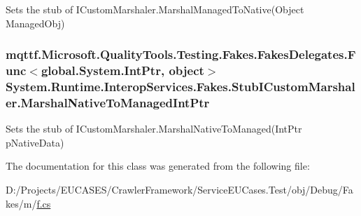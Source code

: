 Sets the stub of I\-Custom\-Marshaler.\-Marshal\-Managed\-To\-Native(\-Object Managed\-Obj)

\hypertarget{class_system_1_1_runtime_1_1_interop_services_1_1_fakes_1_1_stub_i_custom_marshaler_a796680d6b3bdaafdb37f715bb211f792}{
\subsubsection[{Marshal\-Native\-To\-Managed\-Int\-Ptr}]{\setlength{\rightskip}{0pt plus 5cm}mqttf.\-Microsoft.\-Quality\-Tools.\-Testing.\-Fakes.\-Fakes\-Delegates.\-Func$<$global.\-System.\-Int\-Ptr, object$>$ System.\-Runtime.\-Interop\-Services.\-Fakes.\-Stub\-I\-Custom\-Marshaler.\-Marshal\-Native\-To\-Managed\-Int\-Ptr}}\label{class_system_1_1_runtime_1_1_interop_services_1_1_fakes_1_1_stub_i_custom_marshaler_a796680d6b3bdaafdb37f715bb211f792}


Sets the stub of I\-Custom\-Marshaler.\-Marshal\-Native\-To\-Managed(\-Int\-Ptr p\-Native\-Data)



The documentation for this class was generated from the following file\-:\begin{DoxyCompactItemize}
\item 
D\-:/\-Projects/\-E\-U\-C\-A\-S\-E\-S/\-Crawler\-Framework/\-Service\-E\-U\-Cases.\-Test/obj/\-Debug/\-Fakes/m/\hyperlink{m_2f_8cs}{f.\-cs}\end{DoxyCompactItemize}
